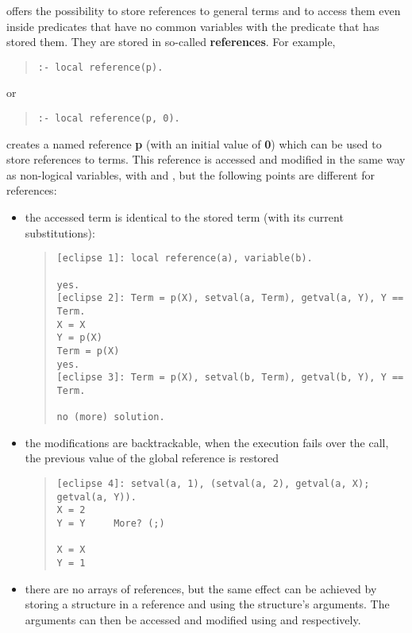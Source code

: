 {\eclipse} offers the possibility to store references to general terms
and to access them even inside predicates that have no common variables
with the predicate that has stored them.
They are stored in so-called {\bf references}.
For example,
\begin{quote}\begin{verbatim}
:- local reference(p).
\end{verbatim}\end{quote}
or
\begin{quote}\begin{verbatim}
:- local reference(p, 0).
\end{verbatim}\end{quote}
creates a named reference {\bf p} (with an initial value of {\bf 0})
which can be used to store references to terms.
This reference is accessed and modified in the same way as non-logical variables,
with 
and ,
but the following points are different for references:
\begin{itemize}
\item the accessed term is identical to the stored term (with its current
substitutions):
\begin{quote}\begin{verbatim}
[eclipse 1]: local reference(a), variable(b).

yes.
[eclipse 2]: Term = p(X), setval(a, Term), getval(a, Y), Y == Term.
X = X
Y = p(X)
Term = p(X)
yes.
[eclipse 3]: Term = p(X), setval(b, Term), getval(b, Y), Y == Term.

no (more) solution.
\end{verbatim}\end{quote}

\item the modifications are backtrackable, when the execution fails
over the  call, the previous value of the global reference is restored

\begin{quote}\begin{verbatim}
[eclipse 4]: setval(a, 1), (setval(a, 2), getval(a, X); getval(a, Y)).
X = 2
Y = Y     More? (;) 

X = X
Y = 1
\end{verbatim}\end{quote}

\item there are no arrays of references, but the same effect can be
achieved by storing a structure in a reference and using the structure's
arguments. The arguments can then be accessed and modified using
 and
 respectively.
\end{itemize}

